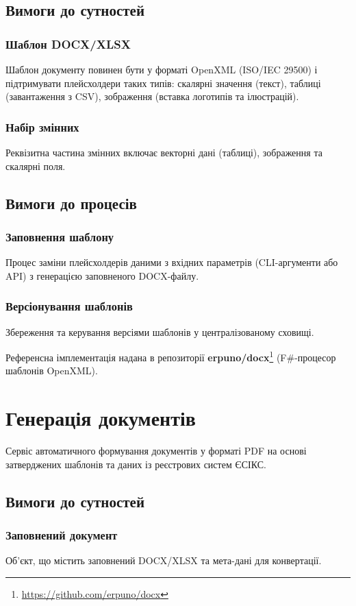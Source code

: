 \documentclass{article}
\begin{document}
\subsection{Вимоги до сутностей}
\subsubsection{Шаблон DOCX/XLSX}
Шаблон документу повинен бути у форматі OpenXML (ISO/IEC 29500) і підтримувати плейсхолдери таких типів: скалярні значення (текст), таблиці (завантаження з CSV), зображення (вставка логотипів та ілюстрацій).

\subsubsection{Набір змінних}
Реквізитна частина змінних включає векторні дані (таблиці), зображення та скалярні поля.

\subsection{Вимоги до процесів}
\subsubsection{Заповнення шаблону}
Процес заміни плейсхолдерів даними з вхідних параметрів (CLI-аргументи або API) з генерацією заповненого DOCX-файлу.

\subsubsection{Версіонування шаблонів}
Збереження та керування версіями шаблонів у централізованому сховищі.

Референсна імплементація надана в репозиторії \textbf{erpuno/docx}\footnote{\url{https://github.com/erpuno/docx}} (F\#-процесор шаблонів OpenXML).

\newpage
\section{Генерація документів}
Сервіс автоматичного формування документів у форматі PDF на основі затверджених шаблонів та даних із реєстрових систем ЄСІКС.

\subsection{Вимоги до сутностей}
\subsubsection{Заповнений документ}
Об’єкт, що містить заповнений DOCX/XLSX та мета-дані для конвертації.
\end{document}
